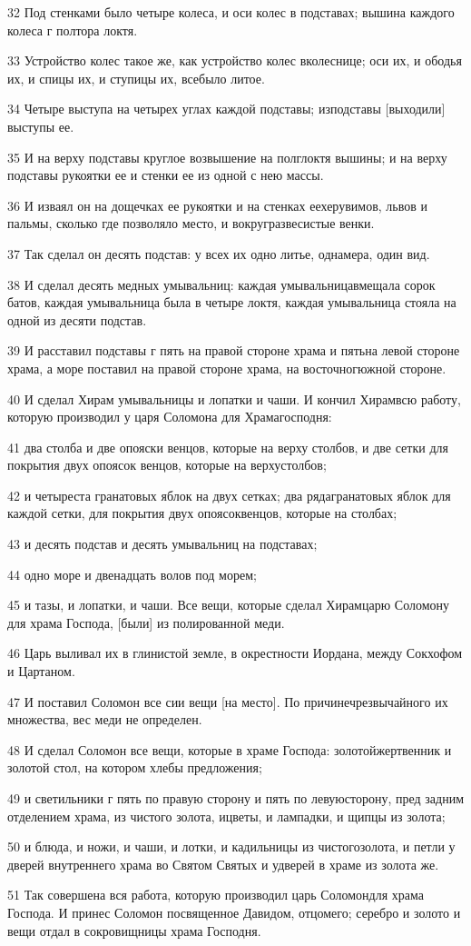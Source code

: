 \par 32 Под стенками было четыре колеса, и оси колес в подставах; вышина каждого колеса г полтора локтя.
\par 33 Устройство колес такое же, как устройство колес вколеснице; оси их, и ободья их, и спицы их, и ступицы их, всебыло литое.
\par 34 Четыре выступа на четырех углах каждой подставы; изподставы [выходили] выступы ее.
\par 35 И на верху подставы круглое возвышение на полглоктя вышины; и на верху подставы рукоятки ее и стенки ее из одной с нею массы.
\par 36 И изваял он на дощечках ее рукоятки и на стенках еехерувимов, львов и пальмы, сколько где позволяло место, и вокругразвесистые венки.
\par 37 Так сделал он десять подстав: у всех их одно литье, однамера, один вид.
\par 38 И сделал десять медных умывальниц: каждая умывальницавмещала сорок батов, каждая умывальница была в четыре локтя, каждая умывальница стояла на одной из десяти подстав.
\par 39 И расставил подставы г пять на правой стороне храма и пятьна левой стороне храма, а море поставил на правой стороне храма, на восточногюжной стороне.
\par 40 И сделал Хирам умывальницы и лопатки и чаши. И кончил Хирамвсю работу, которую производил у царя Соломона для Храмагосподня:
\par 41 два столба и две опояски венцов, которые на верху столбов, и две сетки для покрытия двух опоясок венцов, которые на верхустолбов;
\par 42 и четыреста гранатовых яблок на двух сетках; два рядагранатовых яблок для каждой сетки, для покрытия двух опоясоквенцов, которые на столбах;
\par 43 и десять подстав и десять умывальниц на подставах;
\par 44 одно море и двенадцать волов под морем;
\par 45 и тазы, и лопатки, и чаши. Все вещи, которые сделал Хирамцарю Соломону для храма Господа, [были] из полированной меди.
\par 46 Царь выливал их в глинистой земле, в окрестности Иордана, между Сокхофом и Цартаном.
\par 47 И поставил Соломон все сии вещи [на место]. По причинечрезвычайного их множества, вес меди не определен.
\par 48 И сделал Соломон все вещи, которые в храме Господа: золотойжертвенник и золотой стол, на котором хлебы предложения;
\par 49 и светильники г пять по правую сторону и пять по левуюсторону, пред задним отделением храма, из чистого золота, ицветы, и лампадки, и щипцы из золота;
\par 50 и блюда, и ножи, и чаши, и лотки, и кадильницы из чистогозолота, и петли у дверей внутреннего храма во Святом Святых и удверей в храме из золота же.
\par 51 Так совершена вся работа, которую производил царь Соломондля храма Господа. И принес Соломон посвященное Давидом, отцомего; серебро и золото и вещи отдал в сокровищницы храма Господня.

